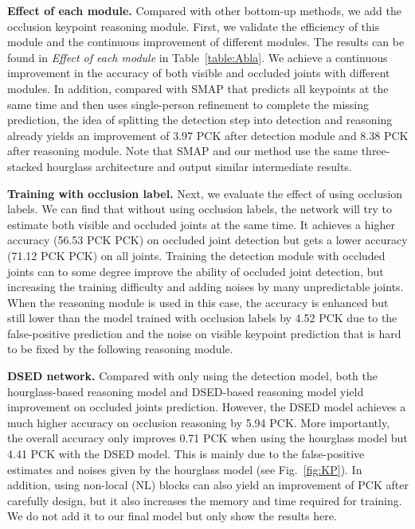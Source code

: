 \noindent\textbf{Effect of each module.}
Compared with other bottom-up methods, we add the occlusion keypoint reasoning module. First, we validate the efficiency of this module and the continuous improvement of different modules. The results can be found in \textit{Effect of each module} in Table~\ref{table:Abla}.  We achieve a continuous improvement in the accuracy of both visible and occluded joints with different modules. In addition, compared with SMAP that predicts all keypoints at the same time and then uses single-person refinement to complete the missing prediction, the idea of splitting the detection step into detection and reasoning already yields an improvement of 3.97 PCK after detection module and 8.38 PCK after reasoning module. Note that SMAP and our method use the same three-stacked hourglass architecture and output similar intermediate results.

\noindent\textbf{Training with occlusion label.} 
Next, we evaluate the effect of using occlusion labels. We can find that without using occlusion labels, the network will try to estimate both visible and occluded joints at the same time. It achieves a higher accuracy (56.53 PCK  PCK) on occluded joint detection but gets a lower accuracy (71.12 PCK  PCK) on all joints.  Training the detection module with occluded joints can to some degree improve the ability of occluded joint detection, but increasing the training difficulty and adding noises by many unpredictable joints. When the reasoning module is used in this case, the accuracy is enhanced but still lower than the model trained with occlusion labels by 4.52 PCK due to the false-positive prediction and the noise on visible keypoint prediction that is hard to be fixed by the following reasoning module.

\noindent\textbf{DSED network.}
Compared with only using the detection model, both the hourglass-based reasoning model and DSED-based reasoning model yield improvement on occluded joints prediction. However, the DSED model achieves a much higher accuracy on occlusion reasoning by 5.94 PCK. More importantly, the overall accuracy only improves 0.71 PCK when using the hourglass model but 4.41 PCK with the DSED model. This is mainly due to the false-positive estimates and noises given by the hourglass model (see Fig.~\ref{fig:KP}). 
In addition, using non-local (NL) blocks can also yield an improvement of  PCK after carefully design, but it also increases the memory and time required for training. We do not add it to our final model but only show the results here.

